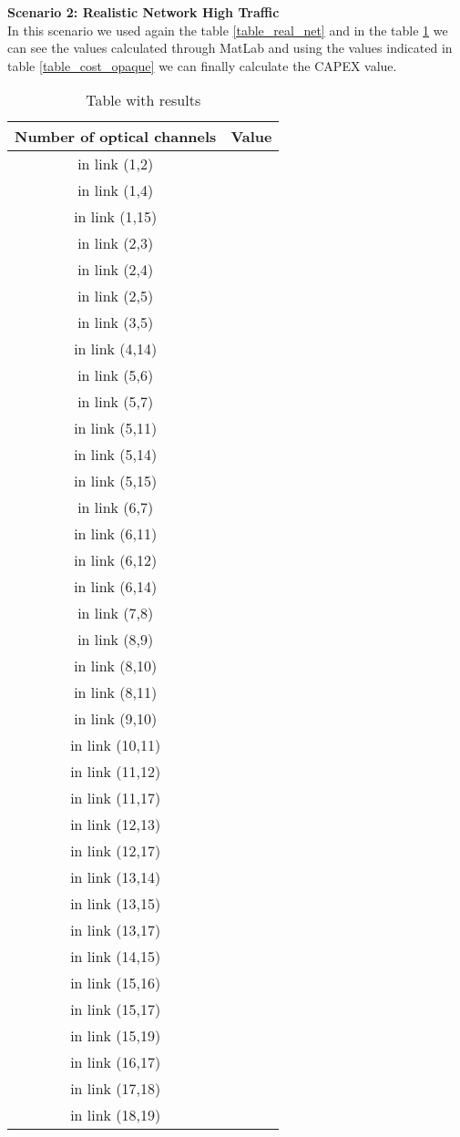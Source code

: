 \textbf{Scenario 2: Realistic Network High Traffic} \label{Scenario4_opaque} \\
In this scenario we used again the table \ref{table_real_net} and in the table \ref{result_ILP4_without} we can see the values calculated through MatLab and using the values indicated in table \ref{table_cost_opaque} we can finally calculate the CAPEX value. \\

\begin{table}[h!]
\centering
\begin{tabular}{|| c | c||}
 \hline
 Number of optical channels & Value \\
 \hline\hline
 in link (1,2) &  \\
in link (1,4) &  \\
in link (1,15) &  \\
in link (2,3) &  \\
in link (2,4) &  \\
in link (2,5) &  \\
in link (3,5) &  \\
in link (4,14) &  \\
in link (5,6) &  \\
in link (5,7) &  \\
in link (5,11) &  \\
in link (5,14) &  \\
in link (5,15) &  \\
in link (6,7) &  \\
in link (6,11) &  \\
in link (6,12) &  \\
in link (6,14) &  \\
in link (7,8) &  \\
in link (8,9) &  \\
in link (8,10) &  \\
in link (8,11) &  \\
in link (9,10) &  \\
in link (10,11) &  \\
in link (11,12) &  \\
in link (11,17) &  \\
in link (12,13) &  \\
in link (12,17) &  \\
in link (13,14) &  \\
in link (13,15) &  \\
in link (13,17) &  \\
in link (14,15) &  \\
in link (15,16) &  \\
in link (15,17) &  \\
in link (15,19) &  \\
in link (16,17) &  \\
in link (17,18) &  \\
in link (18,19) &  \\
\hline
\end{tabular}
\caption{Table with results}
\label{result_ILP4_without}
\end{table}

